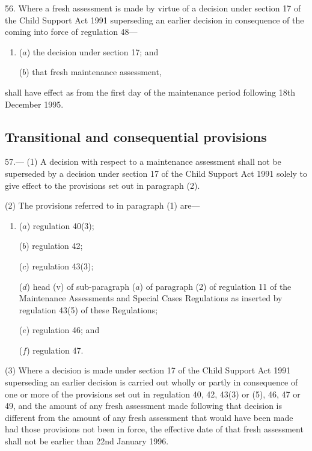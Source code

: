 \documentclass[12pt,a4paper]{article}
\begin{document}
56.  Where a fresh assessment is made by virtue of a decision under section 17 of the Child Support Act 1991 superseding an earlier decision in consequence of the coming into force of regulation 48—
\begin{enumerate}\item[]
($a$) the decision under section 17; and

($b$) that fresh maintenance assessment,
\end{enumerate}
shall have effect as from the first day of the maintenance period following 18th December 1995.


\subsection[57. Transitional and consequential provisions]{Transitional and consequential provisions}

57.—%
%
(1) A decision with respect to a maintenance assessment shall not be superseded by a decision under section 17 of the Child Support Act 1991 solely to give effect to the provisions set out in paragraph (2).

(2) The provisions referred to in paragraph (1) are—
\begin{enumerate}\item[]
($a$) regulation 40(3);

($b$) regulation 42;

($c$) regulation 43(3);

($d$) head (v) of sub-paragraph ($a$) of paragraph (2) of regulation 11 of the Maintenance Assessments and Special Cases Regulations as inserted by regulation 43(5) of these Regulations;

($e$) regulation 46; and

($f$) regulation 47.
\end{enumerate}

(3) 
Where a decision is made under section 17 of the Child Support Act 1991 superseding an earlier decision  %
is carried out wholly or partly in consequence of one or more of the provisions set out in 
regulation 40, 42, 43(3) or (5), 46, 47 or 49,  %
and the amount of any fresh assessment made following 
that decision  %
is different from the amount of any fresh assessment that would have been made had those provisions not been in force, the effective date of that fresh assessment shall not be earlier than 22nd January 1996.
\end{document}
